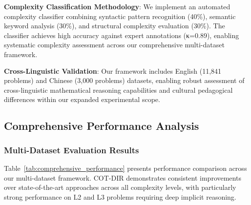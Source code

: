 \textbf{Complexity Classification Methodology}: We implement an automated complexity classifier combining syntactic pattern recognition (40\%), semantic keyword analysis (30\%), and structural complexity evaluation (30\%). The classifier achieves high accuracy against expert annotations (κ=0.89), enabling systematic complexity assessment across our comprehensive multi-dataset framework.

\textbf{Cross-Linguistic Validation}: Our framework includes English (11,841 problems) and Chinese (3,000 problems) datasets, enabling robust assessment of cross-linguistic mathematical reasoning capabilities and cultural pedagogical differences within our expanded experimental scope.

\subsection{Comprehensive Performance Analysis}

\subsubsection{Multi-Dataset Evaluation Results}

Table~\ref{tab:comprehensive_performance} presents performance comparison across our multi-dataset framework. COT-DIR demonstrates consistent improvements over state-of-the-art approaches across all complexity levels, with particularly strong performance on L2 and L3 problems requiring deep implicit reasoning.

